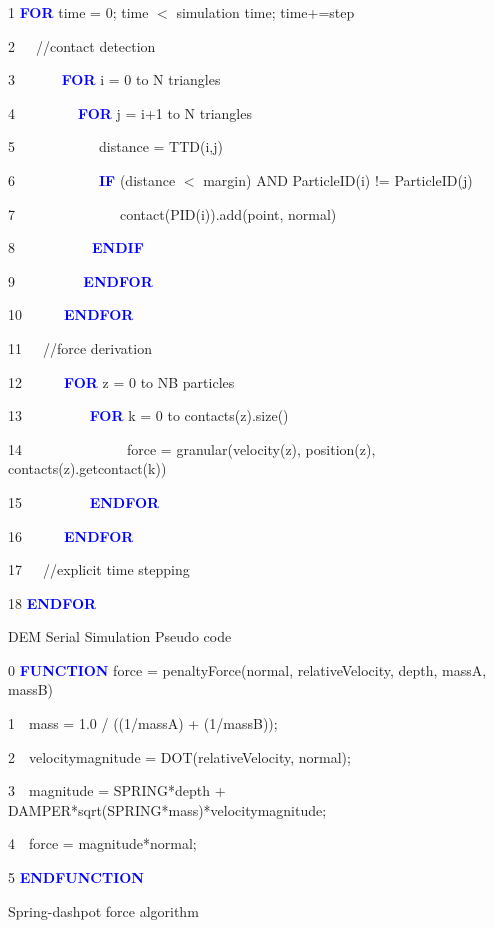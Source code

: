 \documentclass[times,12pt]{article}
\begin{document}
\clearpage

\begin{algorithm}	

1 \textbf{\textcolor{blue}{FOR}} time = 0; time $<$ simulation time; time+=step

2~~~//contact detection
		
3~~~~~~	\textbf{\textcolor{blue}{FOR}} i = 0 to N triangles

4~~~~~~~~~\textbf{\textcolor{blue}{FOR}} j = i+1 to N triangles
				
5~~~~~~~~~~~~distance = TTD(i,j)
				
6~~~~~~~~~~~~\textbf{\textcolor{blue}{IF}} (distance $<$ margin) AND ParticleID(i) != ParticleID(j)

7~~~~~~~~~~~~~~~contact(PID(i)).add(point, normal)

8~~~~~~~~~~~\textbf{\textcolor{blue}{ENDIF}}
			
9~~~~~~~~~\textbf{\textcolor{blue}{	ENDFOR}}
			
10~~~~~~\textbf{\textcolor{blue}{ENDFOR}}

11~~~//force derivation
		
12~~~~~~\textbf{\textcolor{blue}{FOR}} z = 0 to NB particles

13~~~~~~~~~	\textbf{\textcolor{blue}{FOR}} k = 0 to contacts(z).size()

14~~~~~~~~~~~~~~~force = granular(velocity(z), position(z), contacts(z).getcontact(k))

15~~~~~~~~~	\textbf{\textcolor{blue}{ENDFOR}}

16~~~~~~\textbf{\textcolor{blue}{ENDFOR}}
	
17~~~//explicit time stepping

18 \textbf{\textcolor{blue}{ENDFOR}}

\protect\caption{\label{alg1}DEM Serial Simulation Pseudo code}
\end{algorithm}


\begin{algorithm}	
  0 \textbf{\textcolor{blue}{FUNCTION}} force = penaltyForce(normal, relativeVelocity, depth, massA, massB)
  
  1~~mass = 1.0 / ((1/massA) + (1/massB));
  
  2~~velocitymagnitude = DOT(relativeVelocity, normal);
  
  3~~magnitude = SPRING*depth + DAMPER*sqrt(SPRING*mass)*velocitymagnitude;
  
  4~~force = magnitude*normal;
  
  5 \textbf{\textcolor{blue}{ENDFUNCTION}}
\protect\caption{\label{alg2}Spring-dashpot force algorithm}
\end{algorithm}
\end{document}
